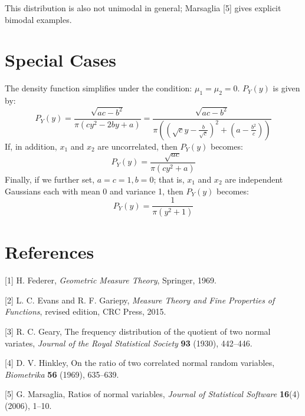 This distribution is also not unimodal in general; Marsaglia [5] gives
explicit bimodal examples.

\section{Special Cases}

The density function simplifies under the condition: 
$\mu_1 = \mu_2 = 0$. $P_Y(y)$ is given by:
$$
P_Y(y) = \frac{\sqrt{ac - b^2}}{\pi (cy^2 - 2by + a)} 
= \frac{\sqrt{ac - b^2}}{\pi \left( (\sqrt{c}y -
\frac{b}{\sqrt{c}})^2 + (a - \frac{b^2}{c})\right)} 
$$
If, in addition, $x_1$ and $x_2$ are uncorrelated, then $P_Y(y)$
becomes:
$$
P_Y(y) = \frac{\sqrt{ac}}{\pi (cy^2 + a)}
$$
Finally, if we further set, $a = c = 1, b = 0$; that is, $x_1$ and $x_2$
are independent
Gaussians each with mean 0 and variance 1, then $P_Y(y)$ becomes:
$$
P_Y(y) = \frac{1}{\pi (y^2 + 1)}
$$

\section{References}

{\parskip=4pt
[1] H. Federer, {\it Geometric Measure Theory}, Springer, 1969.

[2] L. C. Evans and R. F. Gariepy, {\it Measure Theory and Fine Properties
of Functions}, revised edition, CRC Press, 2015.

[3] R. C. Geary, The frequency distribution of the quotient of two normal
variates, {\it Journal of the Royal Statistical Society} {\bf 93} (1930),
442--446.

[4] D. V. Hinkley, On the ratio of two correlated normal random variables,
{\it Biometrika} {\bf 56} (1969), 635--639.

[5] G. Marsaglia, Ratios of normal variables, {\it Journal of Statistical
Software} {\bf 16}(4) (2006), 1--10.
}

\bye


